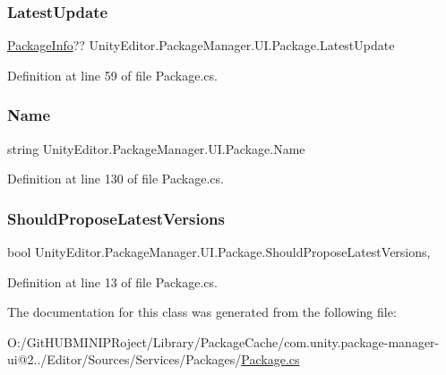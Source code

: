 \subsubsection{\texorpdfstring{LatestUpdate}{LatestUpdate}}
{\footnotesize\ttfamily \mbox{\hyperlink{class_unity_editor_1_1_package_manager_1_1_u_i_1_1_package_info}{Package\+Info}}?? Unity\+Editor.\+Package\+Manager.\+U\+I.\+Package.\+Latest\+Update\hspace{0.3cm}{\ttfamily [get]}}



Definition at line 59 of file Package.\+cs.

\mbox{\label{class_unity_editor_1_1_package_manager_1_1_u_i_1_1_package_a1044e19763ce3d709ee4547b975a1472}} 
\subsubsection{\texorpdfstring{Name}{Name}}
{\footnotesize\ttfamily string Unity\+Editor.\+Package\+Manager.\+U\+I.\+Package.\+Name\hspace{0.3cm}{\ttfamily [get]}}



Definition at line 130 of file Package.\+cs.

\mbox{\label{class_unity_editor_1_1_package_manager_1_1_u_i_1_1_package_ab997af9e3e2f5d8dbeb5c8cff8d4bec9}} 
\subsubsection{\texorpdfstring{ShouldProposeLatestVersions}{ShouldProposeLatestVersions}}
{\footnotesize\ttfamily bool Unity\+Editor.\+Package\+Manager.\+U\+I.\+Package.\+Should\+Propose\+Latest\+Versions\hspace{0.3cm}{\ttfamily [static]}, {\ttfamily [get]}}



Definition at line 13 of file Package.\+cs.



The documentation for this class was generated from the following file\+:\begin{DoxyCompactItemize}
\item 
O\+:/\+Git\+H\+U\+B\+M\+I\+N\+I\+P\+Roject/\+Library/\+Package\+Cache/com.\+unity.\+package-\/manager-\/ui@2../\+Editor/\+Sources/\+Services/\+Packages/\mbox{\hyperlink{_package_8cs}{Package.\+cs}}\end{DoxyCompactItemize}
